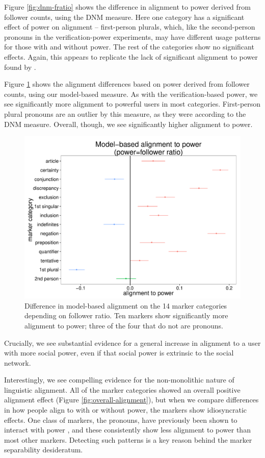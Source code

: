 \documentclass{acm_proc_article-sp}
\begin{document}
Figure \ref{fig:dnm-fratio} shows the difference in alignment to power derived from follower counts, using the DNM measure. Here one category has a significant effect of power on alignment -- first-person plurals, which, like the second-person pronouns in the verification-power experiments, may have different usage patterns for those with and without power.  The rest of the categories show no significant effects.  Again, this appears to replicate the lack of significant alignment to power found by \cite{DNMGamonDumais2011}.

Figure \ref{fig:our-fratio} shows the alignment differences based on power derived from follower counts, using our model-based measure.  As with the verification-based power, we see significantly more alignment to powerful users in most categories. First-person plural pronouns are an outlier by this measure, as they were according to the DNM measure.  Overall, though, we see significantly higher alignment to power.

\begin{figure}
\centering
\includegraphics[width=.9\columnwidth]{graphics/www2016_ourpowerdiff_fratio.pdf}
\caption{Difference in model-based alignment on the 14 marker categories depending on follower ratio. Ten markers show significantly more alignment to power; three of the four that do not are pronouns.}\label{fig:our-fratio}
\end{figure}

  Crucially, we see substantial evidence for a general increase in alignment to a user with more social power, even if that social power is extrinsic to the social network.

Interestingly, we see compelling evidence for the non-monolithic nature of linguistic alignment. All of the marker categories showed an overall positive alignment effect (Figure \ref{fig:overall-alignment}), but when we compare differences in how people align to with or without power, the markers show idiosyncratic effects.  One class of markers, the pronouns, have previously been shown to interact with power \cite{KacewiczEtAl2013}, and these consistently show less alignment to power than most other markers. Detecting such patterns is a key reason behind the marker separability desideratum.
\end{document}
